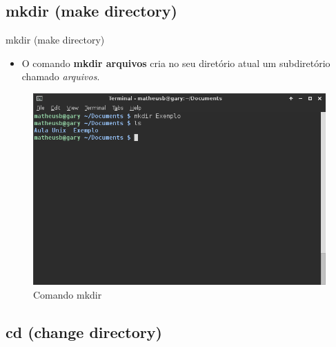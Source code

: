 \documentclass{beamer}
\begin{document}
\subsection{mkdir (make directory)}

\begin{frame}{mkdir (make directory)}
  \begin{itemize}
  \item {
   O comando \textbf{mkdir arquivos} cria no seu diretório atual um subdiretório chamado \textit{arquivos}.
  }
 \end{itemize}
   \begin{figure}[h!]
        \centering
        \includegraphics[scale=0.30]{mkdir.png}
        \caption{Comando mkdir}
        \label{fig:Comando mkdir}
    \end{figure}
\end{frame}

\subsection{cd (change directory)}
\end{document}
